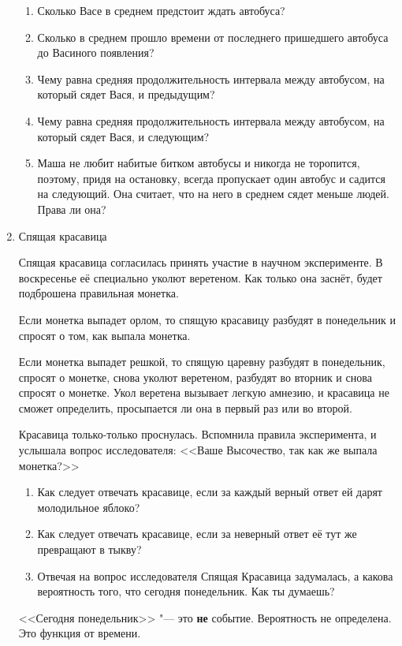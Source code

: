 \documentclass[nobib]{tufte-handout}
\begin{document}
\begin{enumerate}
\begin{enumerate}
\item Сколько Васе в среднем предстоит ждать автобуса?
\item Сколько в среднем прошло времени от последнего пришедшего автобуса до Васиного появления?
\item Чему равна средняя продолжительность интервала между автобусом, на который сядет Вася, и предыдущим?
\item Чему равна средняя продолжительность интервала между автобусом, на который сядет Вася, и следующим?
\item Маша не любит набитые битком автобусы и никогда не торопится, поэтому, придя на остановку, всегда пропускает один автобус и садится на следующий. Она считает, что на него в среднем сядет меньше людей. Права ли она?
\end{enumerate}

\item Спящая красавица

Спящая красавица согласилась принять участие в научном
эксперименте. В воскресенье её специально уколют веретеном. Как
только она заснёт, будет подброшена правильная монетка. 


Если
монетка выпадет орлом, то спящую красавицу разбудят в понедельник
и спросят о том, как выпала монетка. 


Если монетка выпадет решкой,
то спящую царевну разбудят в понедельник, спросят о монетке, снова
уколют веретеном, разбудят во вторник и снова спросят о монетке.
Укол веретена вызывает легкую амнезию, и красавица не сможет
определить, просыпается ли она в первый раз или во второй.


Красавица только-только проснулась. Вспомнила правила эксперимента, и услышала вопрос исследователя: <<Ваше Высочество, так как же выпала монетка?>>
\begin{enumerate}
\item Как следует отвечать красавице, если за каждый верный ответ ей
дарят молодильное яблоко?
\item Как следует отвечать красавице, если за неверный ответ её тут
же превращают в тыкву?
\item Отвечая на вопрос исследователя Спящая Красавица задумалась, а какова вероятность того, что сегодня понедельник. Как ты думаешь?
\end{enumerate}



\begin{solution}
<<Сегодня понедельник>> "--- это \textbf{не} событие. Вероятность не
определена. Это функция от времени.


\end{solution}
\end{enumerate}
\end{document}
